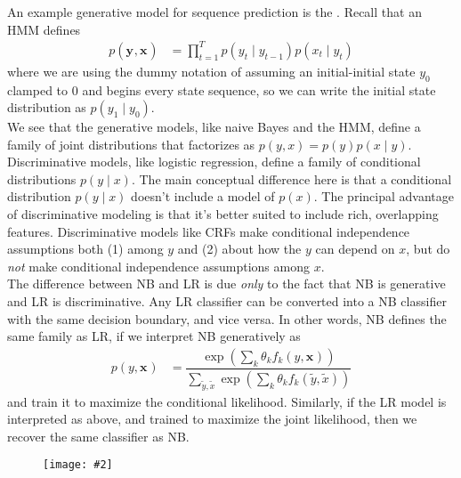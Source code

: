 \documentclass[11pt]{article}
\renewcommand\vec[2][]{\bm{#2}_{#1}}
\newcommand\myfig[2][0.3\textwidth]{\begin{figure}[h!]\centering\texttt{[image: \#2]}\end{figure}}
\newcommand\p{\Needspace{10\baselineskip} \noindent}
\begin{document}
An example generative model for sequence prediction is the . Recall that an HMM defines
\begin{align}
	p(\vec{y}, \vec{x}) &= \prod_{t = 1}^{T} p(y_t \mid y_{t-1}) p(x_t \mid y_t) 
\end{align}
where we are using the dummy notation of assuming an initial-initial state $y_0$ clamped to 0 and begins every state sequence, so we can write the initial state distribution as $p(y_1 \mid y_0)$. \\

\p We see that the generative models, like naive Bayes and the HMM, define a family of joint distributions that factorizes as $p(y, x) = p(y)p(x \mid y)$. Discriminative models, like logistic regression, define a family of conditional distributions $p(y \mid x)$. The main conceptual difference here is that a conditional distribution $p(y \mid x)$ doesn't include a model of $p(x)$. The principal advantage of discriminative modeling is that it's better suited to include rich, overlapping features. Discriminative models like CRFs make conditional independence assumptions both (1) among $y$ and (2) about how the $y$ can depend on $x$, but do \textit{not} make conditional independence assumptions among $x$.  \\

\p The difference between NB and LR is due \textit{only} to the fact that NB is generative and LR is discriminative. Any LR classifier can be converted into a NB classifier with the same decision boundary, and vice versa. In other words, NB defines the same family as LR, if we interpret NB generatively as 
\begin{align}
	p(y, \vec{x}) &= \dfrac{
		\exp \left( \sum_k \theta_k f_k(y, \vec{x}) \right) 
		}{
		\sum_{\widetilde{y}, \widetilde{x} } \exp \left( \sum_k \theta_k f_k(\widetilde y, \widetilde x)  \right)
		}
\end{align}
and train it to maximize the conditional likelihood. Similarly, if the LR model is interpreted as above, and trained to maximize the joint likelihood, then we recover the same classifier as NB.

\myfig[0.7\textwidth]{figs/intro_crf_2_4.png}
\end{document}
